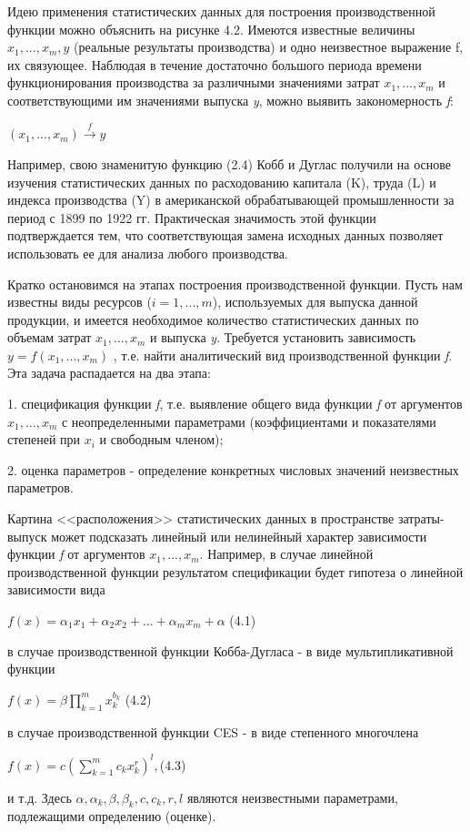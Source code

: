 \documentclass[12pt, 4paper]{book}
\begin{document}
{Идею применения статистических данных для построения производственной функции можно объяснить на рисунке 4.2. Имеются известные величины $x_1,...,x_m,y$ (реальные результаты производства) и одно неизвестное выражение f, их связующее. Наблюдая в течение достаточно большого периода времени функционирования производства за различными значениями затрат $x_1,...,x_m$ и соответствующими им значениями выпуска \textit{y}, можно выявить закономерность \textit{f}: 
\begin{center}
$(x_1,...,x_m)\stackrel{f}{\rightarrow} y$
\end{center}
\par

Например, свою знаменитую функцию (2.4) Кобб и Дуглас получили на основе изучения статистических данных по расходованию капитала (K), труда (L) и индекса производства (Y) в американской обрабатывающей промышленности за период с 1899 по 1922 гг. Практическая значимость этой функции подтверждается тем, что соответствующая замена исходных данных позволяет использовать ее для анализа любого производства.
\par

Кратко остановимся на этапах построения производственной функции. Пусть нам известны виды ресурсов ($i=1,...,m$), используемых для выпуска данной продукции, и имеется необходимое количество статистических данных по объемам затрат $x_1,...,x_m$ и выпуска \textit{y}. Требуется установить зависимость $y=f(x_1,...,x_m)$ , т.е. найти аналитический вид производственной функции \textit{f}. Эта задача распадается на два этапа: 
\par

1.	спецификация функции \textit{f}, т.е. выявление общего вида функции \textit{f} от аргументов $x_1,...,x_m$  с неопределенными параметрами (коэффициентами и показателями степеней при $x_i$ и свободным членом); 
\par

2.	оценка параметров - определение конкретных числовых значений неизвестных параметров.
\par

Картина <<расположения>> статистических данных в пространстве затраты-выпуск может подсказать линейный или нелинейный характер зависимости функции \textit{f} от аргументов $x_1,...,x_m$. Например, в случае линейной производственной функции результатом спецификации будет гипотеза о линейной зависимости вида 
\begin{center}
$f(x)=\alpha_1 x_1 + \alpha_2 x_2 + ... + \alpha_m x_m + \alpha$ (4.1)
\end{center}
в случае производственной функции Кобба-Дугласа - в виде мультипликативной функции 
\begin{center}
$f(x)=\beta \prod\limits_{k=1}^{m} x_{k}^{b_k}$ (4.2)
\end{center}
в случае производственной функции CES - в виде степенного многочлена 
\begin{center}
$f(x)=c(\sum\limits_{k=1}^{m}c_k x_{k}^{r})^l,$(4.3)
\end{center}
и т.д. Здесь $\alpha ,\alpha_k,\beta,\beta_k,c,c_k,r,l$ являются неизвестными параметрами, подлежащими определению (оценке). 
\par

}
\end{document}
